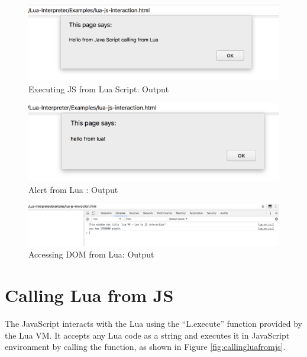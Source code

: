 \begin{figure}[H]
	\begin{center}
		\includegraphics[width=\linewidth]{./images/alert-from-javascript-eval.png}
	\end{center}
	\caption{Executing JS from Lua Script: Output}
	\label{fig:alert-from-javascript-eval}
\end{figure}

\begin{figure}[H]
	\begin{center}
		\includegraphics[width=\linewidth]{./images/alert-from-lua.png}
	\end{center}
	\caption{Alert from Lua : Output}
	\label{fig:alert-from-lua}
\end{figure}

\begin{figure}[H]
	\begin{center}
		\includegraphics[width=\linewidth]{./images/printing-document-title.png}
	\end{center}
	\caption{Accessing DOM from Lua: Output}
	\label{fig:printing-document-title}
\end{figure}

\section{Calling Lua from JS}

The JavaScript interacts with the Lua using the ``L.execute'' function provided by the Lua VM. It accepts any Lua code as a string and executes it in JavaScript environment by calling the function, as shown in Figure \ref{fig:callingluafromjs}. 


